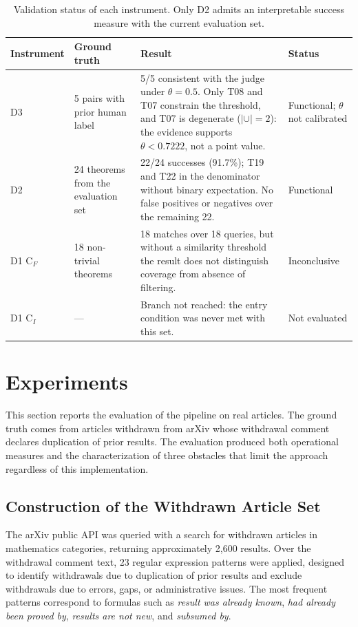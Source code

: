 \documentclass{article}
\theoremstyle{remark}
\begin{document}
\begin{table}[htbp]
\centering
\small
\setlength{\tabcolsep}{4pt}
\renewcommand{\arraystretch}{1.15}
\begin{tabular}{p{1.9cm}p{2.6cm}p{6.4cm}p{3.4cm}}
\toprule
Instrument & Ground truth & Result & Status \\
\midrule
D3 &
5 pairs with prior human label &
5/5 consistent with the judge under $\theta = 0.5$. Only T08 and T07 constrain the threshold, and T07 is degenerate ($|\cup| = 2$): the evidence supports $\theta < 0.7222$, not a point value. &
Functional; $\theta$ not calibrated \\
\addlinespace
D2 &
24 theorems from the evaluation set &
22/24 successes (91.7\%); T19 and T22 in the denominator without binary expectation. No false positives or negatives over the remaining 22. &
Functional \\
\addlinespace
D1 C$_F$ &
18 non-trivial theorems &
18 matches over 18 queries, but without a similarity threshold the result does not distinguish coverage from absence of filtering. &
Inconclusive \\
\addlinespace
D1 C$_I$ &
--- &
Branch not reached: the entry condition was never met with this set. &
Not evaluated \\
\bottomrule
\end{tabular}
\caption{Validation status of each instrument. Only D2 admits an interpretable success measure with the current evaluation set.}
\label{tab:instrumentos}
\end{table}


\section{Experiments}

\label{sec:experimentos}

This section reports the evaluation of the pipeline on real articles. The ground truth comes from articles withdrawn from arXiv whose withdrawal comment declares duplication of prior results. The evaluation produced both operational measures and the characterization of three obstacles that limit the approach regardless of this implementation.

\subsection{Construction of the Withdrawn Article Set}

The arXiv public API was queried with a search for withdrawn articles in mathematics categories, returning approximately 2,600 results. Over the withdrawal comment text, 23 regular expression patterns were applied, designed to identify withdrawals due to duplication of prior results and exclude withdrawals due to errors, gaps, or administrative issues. The most frequent patterns correspond to formulas such as \textit{result was already known}, \textit{had already been proved by}, \textit{results are not new}, and \textit{subsumed by}.
\end{document}
